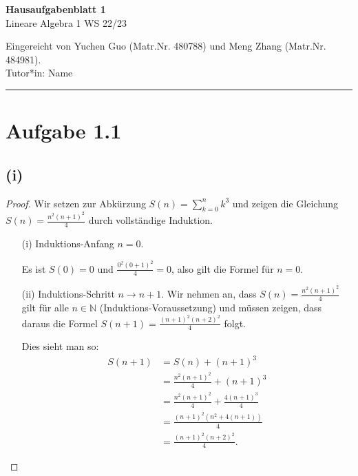 \documentclass{article}
\begin{document}
\begin{center}
    \Huge \textbf{Hausaufgabenblatt 1} %
    \\
    \tiny Lineare Algebra 1 WS 22/23
\end{center}
\begin{center}
Eingereicht von Yuchen Guo (Matr.Nr. 480788) und Meng Zhang (Matr.Nr. 484981).\\
Tutor*in: Name
\end{center}

\hrule
\section*{Aufgabe 1.1}
\subsection*{(i)}
\begin{proof}
  Wir setzen zur Abkürzung \(S(n)=\sum_{k=0}^n{k^3}\) und zeigen die
  Gleichung \(S(n) = \frac{n^2(n+1)^2}{4}\) durch vollständige
  Induktion.

\begin{itemize}
\item[(i)] Induktions-Anfang \(n=0\).

  Es ist \(S(0)=0\) und \(\frac{0^2(0+1)^2}{4}=0\), also gilt die Formel für \(n=0\).
\item[(ii)] Induktions-Schritt \(n \rightarrow n+1\).  Wir nehmen an,
  dass \(S(n)=\frac{n^2(n+1)^2}{4}\) gilt für alle \(n \in \mathbb{N}\)
  (Induktions-Voraussetzung) und müssen zeigen, dass daraus die Formel
  \(S(n+1)=\frac{(n+1)^2(n+2)^2}{4}\) folgt.

  Dies sieht man so:
\begin{align*}
  S(n+1) &= S(n) + (n+1)^3 \\
         &= \frac{n^2(n+1)^2}{4} + (n+1)^3 \tag*{Induktions-Voraussetzung} \\
         &= \frac{n^2(n+1)^2}{4} + \frac{4(n+1)^3}{4} \\
         &= \frac{(n+1)^2(n^2+4(n+1))}{4} \\
         &= \frac{(n+1)^2(n+2)^2}{4}.
\end{align*}
\end{itemize}
\end{proof}
\end{document}
